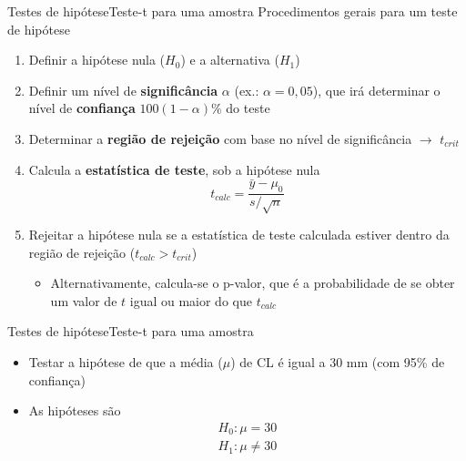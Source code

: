 \documentclass[10pt]{beamer}\usepackage{graphicx, color}
\begin{document}
\begin{frame}[fragile=singleslide]{Testes de hipótese}{Teste-t
    para uma amostra}
Procedimentos gerais para um teste de hipótese
\begin{enumerate}
\item Definir a hipótese nula ($H_0$) e a alternativa ($H_1$)
\item Definir um nível de \textbf{significância} $\alpha$ (ex.: $\alpha
  = 0,05$), que irá determinar o nível de \textbf{confiança}
  $100(1-\alpha)\%$ do teste
\item Determinar a \textbf{região de rejeição} com base no nível de
  significância $\rightarrow$ $t_{crit}$
\item Calcula a \textbf{estatística de teste}, sob a hipótese nula
  \begin{equation*}
    t_{calc} = \frac{\bar{y} - \mu_0}{s/\sqrt{n}}
  \end{equation*}
\item Rejeitar a hipótese nula se a estatística de teste calculada
  estiver dentro da região de rejeição ($t_{calc} > t_{crit}$)
  \begin{itemize}
  \item Alternativamente, calcula-se o p-valor, que é a probabilidade de
    se obter um valor de $t$ igual ou maior do que $t_{calc}$
  \end{itemize}
\end{enumerate}
\end{frame}

\begin{frame}[fragile=singleslide]{Testes de hipótese}{Teste-t para uma
    amostra}
  \begin{itemize}
  \item Testar a hipótese de que a média ($\mu$) de CL é igual a 30 mm
    (com 95\% de confiança)
  \item As hipóteses são
    \begin{align*}
      H_0: \mu = 30 \\
      H_1: \mu \neq 30
    \end{align*}
  \end{itemize}
\end{frame}
\end{document}
